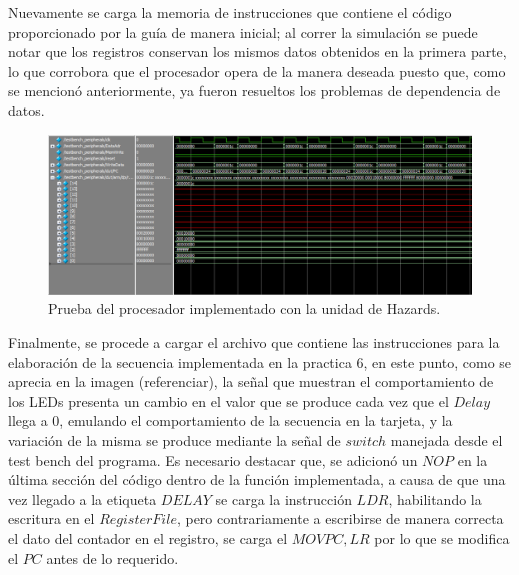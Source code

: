Nuevamente se carga la memoria de instrucciones que contiene el código proporcionado por la guía de manera inicial; al correr la simulación se puede notar que los registros conservan los mismos datos obtenidos en la primera parte, lo que corrobora que el procesador opera de la manera deseada puesto que, como se mencionó anteriormente, ya fueron resueltos los problemas de dependencia de datos.\\

\begin{figure}[H]
	\centering
	\includegraphics[width = \linewidth]{images/SGCH.PNG}
	\caption{Prueba del procesador implementado con la unidad de Hazards.}
	\label{fig:Código guiá con unidad de Hazards}
\end{figure}

Finalmente, se procede a cargar el archivo que contiene las instrucciones para la elaboración de la secuencia implementada en la practica 6, en este punto, como se aprecia en la imagen (referenciar), la señal que muestran el comportamiento de los LEDs presenta un cambio en el valor que se produce cada vez que el $Delay$ llega a 0, emulando el comportamiento de la secuencia en la tarjeta, y la variación de la misma se produce mediante la señal de $switch$ manejada desde el test bench del programa. Es necesario destacar que, se adicionó un $NOP$ en la última sección del código dentro de la función implementada, a causa de que una vez llegado a la etiqueta $DELAY$ se carga la instrucción $LDR$, habilitando la escritura en el $Register File$, pero contrariamente a escribirse de manera correcta el dato del contador en el registro, se carga el $MOV PC, LR$ por lo que se modifica el $PC$ antes de lo requerido.\\

